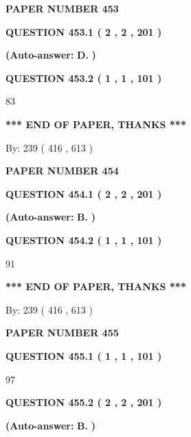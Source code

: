 \documentclass{ctexart}
\begin{document}
   
 {\textbf{ \Large{ PAPER NUMBER  453  }}}
   
   
   
   
  
  
{\textbf{\large{QUESTION
453.1 
 ( 2 , 2 , 201 )
}}}
 
 
{\textbf{(Auto-answer:}}
{\textbf{\large{
D.}}}
{\textbf{)}}
 
 
  
  
{\textbf{\large{QUESTION
453.2 
 ( 1 , 1 , 101 )
}}}

83
   
   
   
   
\vspace{1.0in} 
{\textbf{\large{ *** END OF PAPER, THANKS *** }}} 
   
   
\hspace{1.0in} By: 
 239 ( 416 ,  613 )
   
   
   
   
\newpage 
\setcounter{page}{ 
   454001 } 
   
   
 {\textbf{ \Large{ PAPER NUMBER  454  }}}
   
   
   
   
  
  
{\textbf{\large{QUESTION
454.1 
 ( 2 , 2 , 201 )
}}}
 
 
{\textbf{(Auto-answer:}}
{\textbf{\large{
B.}}}
{\textbf{)}}
 
 
  
  
{\textbf{\large{QUESTION
454.2 
 ( 1 , 1 , 101 )
}}}

91
   
   
   
   
\vspace{1.0in} 
{\textbf{\large{ *** END OF PAPER, THANKS *** }}} 
   
   
\hspace{1.0in} By: 
 239 ( 416 ,  613 )
   
   
   
   
\newpage 
\setcounter{page}{ 
   455001 } 
   
   
 {\textbf{ \Large{ PAPER NUMBER  455  }}}
   
   
   
   
  
  
{\textbf{\large{QUESTION
455.1 
 ( 1 , 1 , 101 )
}}}

97
  
  
{\textbf{\large{QUESTION
455.2 
 ( 2 , 2 , 201 )
}}}
 
 
{\textbf{(Auto-answer:}}
{\textbf{\large{
B.}}}
{\textbf{)}}
 
\end{document}
